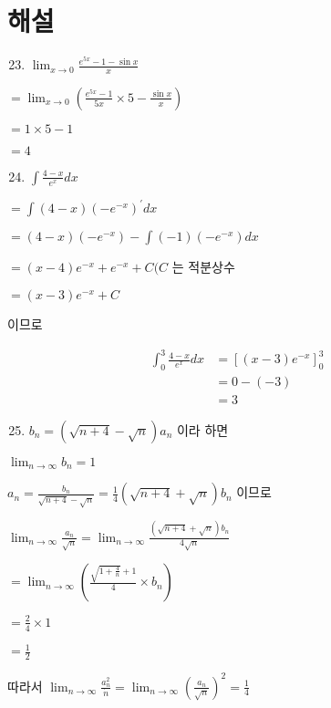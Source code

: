\documentclass[10pt]{article}
\begin{document}
\section*{해설}
\begin{enumerate}
  \setcounter{enumi}{22}
  \item $\lim _{x \rightarrow 0} \frac{e^{5 x}-1-\sin x}{x}$
\end{enumerate}

$=\lim _{x \rightarrow 0}\left(\frac{e^{5 x}-1}{5 x} \times 5-\frac{\sin x}{x}\right)$

$=1 \times 5-1$

$=4$

\begin{enumerate}
  \setcounter{enumi}{23}
  \item $\int \frac{4-x}{e^{x}} d x$
\end{enumerate}

$=\int(4-x)\left(-e^{-x}\right)^{\prime} d x$

$=(4-x)\left(-e^{-x}\right)-\int(-1)\left(-e^{-x}\right) d x$

$=(x-4) e^{-x}+e^{-x}+C(C$ 는 적분상수

$=(x-3) e^{-x}+C$

이므로

\[
\begin{aligned}
\int_{0}^{3} \frac{4-x}{e^{x}} d x & =\left[(x-3) e^{-x}\right]_{0}^{3} \\
& =0-(-3) \\
& =3
\end{aligned}
\]

\begin{enumerate}
  \setcounter{enumi}{24}
  \item $b_{n}=(\sqrt{n+4}-\sqrt{n}) a_{n}$ 이라 하면
\end{enumerate}

$\lim _{n \rightarrow \infty} b_{n}=1$

$a_{n}=\frac{b_{n}}{\sqrt{n+4}-\sqrt{n}}=\frac{1}{4}(\sqrt{n+4}+\sqrt{n}) b_{n}$ 이므로

$\lim _{n \rightarrow \infty} \frac{a_{n}}{\sqrt{n}}=\lim _{n \rightarrow \infty} \frac{(\sqrt{n+4}+\sqrt{n}) b_{n}}{4 \sqrt{n}}$

$=\lim _{n \rightarrow \infty}\left(\frac{\sqrt{1+\frac{4}{n}}+1}{4} \times b_{n}\right)$

$=\frac{2}{4} \times 1$

$=\frac{1}{2}$

따라서 $\lim _{n \rightarrow \infty} \frac{a_{n}^{2}}{\dot{n}}=\lim _{n \rightarrow \infty}\left(\frac{a_{n}}{\sqrt{n}}\right)^{2}=\frac{1}{4}$
\end{document}
